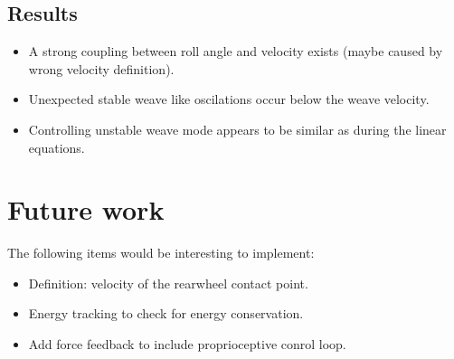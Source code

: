 \subsection{Results}
			\begin{itemize}
			\item A strong coupling between roll angle and velocity exists (maybe caused by wrong velocity definition).
			\item Unexpected stable weave like oscilations occur below the weave velocity. 
			\item Controlling unstable weave mode appears to be similar as during the linear equations.
			\end{itemize}
\section{Future work}
The following items would be interesting to implement:
			\begin{itemize}
			\item Definition: velocity of the rearwheel contact point.
			\item Energy tracking to check for energy conservation.
			\item Add force feedback to include proprioceptive conrol loop.
			\end{itemize}
